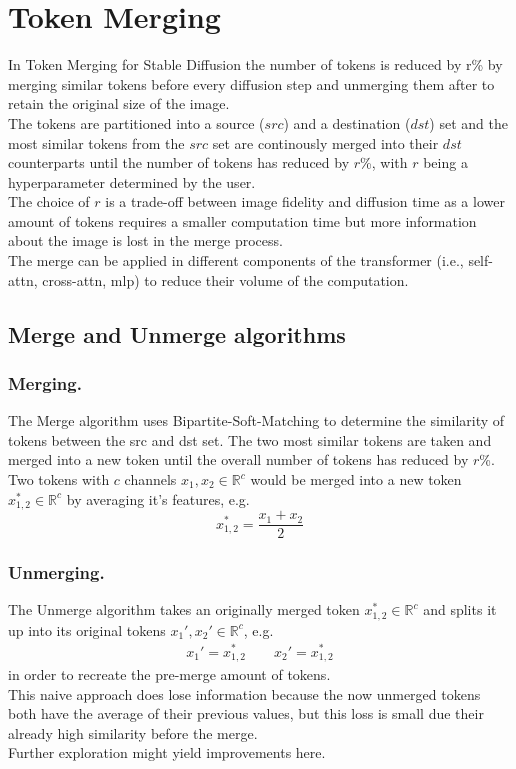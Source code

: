\section{Token Merging}
In Token Merging for Stable Diffusion\cite{bolya2023tomesd} the number of tokens is reduced by r\% by merging similar tokens before every diffusion step and unmerging them after to retain the original size of the image.\\
The tokens are partitioned into a source (\(src\)) and a destination (\(dst\)) set and the most similar tokens from the \(src\) set are continously merged into their \(dst\) counterparts until the number of tokens has reduced by \(r\)\%, with \(r\) being a hyperparameter determined by the user.\\ 
The choice of \(r\) is a trade-off between image fidelity and diffusion time as a lower amount of tokens requires a smaller computation time but more information about the image is lost in the merge process.\\
The merge can be applied in different components of the transformer (i.e., self-attn, cross-attn, mlp) to reduce their volume of the computation. 

\subsection{Merge and Unmerge algorithms}
\subsubsection*{Merging.} The Merge algorithm uses Bipartite-Soft-Matching to determine the similarity of tokens between the src and dst set. The two most similar tokens are taken and merged into a new token until the overall number of tokens has reduced by \(r\)\%.\\
Two tokens with \(c\) channels \(x_1, x_2 \in \mathbb{R}^c\) would be merged into a new token \(x_{1,2}^* \in \mathbb{R}^c \) by averaging it's features, e.g. \[x_{1,2}^* = \frac{x_1 + x_2}{2}\]

\subsubsection*{Unmerging.} The Unmerge algorithm takes an originally merged token $x_{1,2}^* \in \mathbb{R}^c$ and splits it up into its original tokens $x_1', x_2' \in \mathbb{R}^c$, e.g. 
\begin{align*}
    x_1' = x_{1,2}^* \quad\quad
    x_2' = x_{1,2}^*
\end{align*}
in order to recreate the pre-merge amount of tokens.\\
This naive approach does lose information because the now unmerged tokens both have the average of their previous values, but this loss is small due their already high similarity before the merge.\\ Further exploration might yield improvements here.


